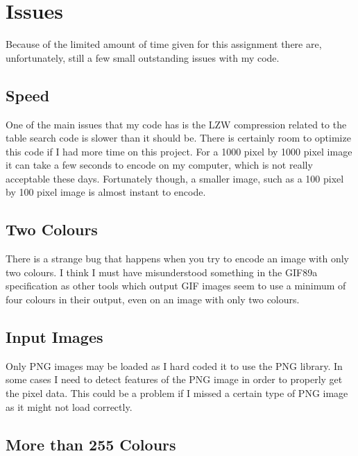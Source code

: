 \documentclass[11pt]{article} %
\begin{document}
\section{Issues}
Because of the limited amount of time given for this assignment there are, unfortunately, still a few small outstanding issues with my code.
\subsection{Speed}
One of the main issues that my code has is the LZW compression related to the table search code is slower than it should be. There is certainly room to optimize this code if I had more time on this project. For a 1000 pixel by 1000 pixel image it can take a few seconds to encode on my computer, which is not really acceptable these days. Fortunately though, a smaller image, such as a 100 pixel by 100 pixel image is almost instant to encode.
\subsection{Two Colours}
There is a strange bug that happens when you try to encode an image with only two colours. I think I must have misunderstood something in the GIF89a specification as other tools which output GIF images seem to use a minimum of four colours in their output, even on an image with only two colours.
\subsection{Input Images}
Only PNG images may be loaded as I hard coded it to use the PNG library. In some cases I need to detect features of the PNG image in order to properly get the pixel data. This could be a problem if I missed a certain type of PNG image as it might not load correctly.
\subsection{More than 255 Colours}



\end{document}
